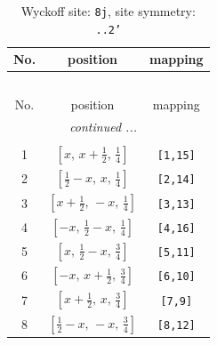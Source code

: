 \documentclass[fleqn,8pt]{jsarticle}
\begin{document}
\begin{longtable}{ccc}
\caption{Wyckoff site: {\tt 8j}, site symmetry: {\tt ..2'}}
 \\
 \hline \hline
No. & position & mapping \\ \hline \endfirsthead

\multicolumn{2}{l}{\tablename\ \thetable{}} \\
 \hline \hline
No. & position & mapping \\ \hline \endhead

 \hline \hline
\multicolumn{2}{r}{\footnotesize\it continued ...} \\ \endfoot

 \hline \hline
\multicolumn{2}{r}{} \\ \endlastfoot

1 & $\left[ x,\, x + \frac{1}{2},\, \frac{1}{4} \right]$ & {\tt [1,15]} \\ \hline
2 & $\left[ \frac{1}{2} - x,\, x,\, \frac{1}{4} \right]$ & {\tt [2,14]} \\ \hline
3 & $\left[ x + \frac{1}{2},\, - x,\, \frac{1}{4} \right]$ & {\tt [3,13]} \\ \hline
4 & $\left[ - x,\, \frac{1}{2} - x,\, \frac{1}{4} \right]$ & {\tt [4,16]} \\ \hline
5 & $\left[ x,\, \frac{1}{2} - x,\, \frac{3}{4} \right]$ & {\tt [5,11]} \\ \hline
6 & $\left[ - x,\, x + \frac{1}{2},\, \frac{3}{4} \right]$ & {\tt [6,10]} \\ \hline
7 & $\left[ x + \frac{1}{2},\, x,\, \frac{3}{4} \right]$ & {\tt [7,9]} \\ \hline
8 & $\left[ \frac{1}{2} - x,\, - x,\, \frac{3}{4} \right]$ & {\tt [8,12]} \\
\end{longtable}
\renewcommand{\arraystretch}{1.2}
\end{document}
